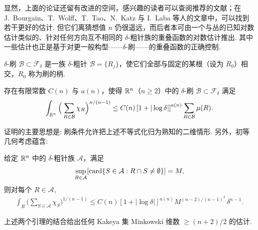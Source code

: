 显然，上面的论证还留有改进的空间，感兴趣的读者可以查阅推荐的文献；在 J.~Bourgain、T.~Wolff、T.~Tao、N.~Katz 与 I.~Laba 等人的文章中，可以找到若干更好的估计. 但它们离猜想值 $n$ 仍很遥远，而后者本可由一个与丛的已知对数估计类似的、针对任何方向互不相同的 $\delta$-粗针族的重叠函数的对数估计推出. 其中一些估计也正是基于对更一般构型——$\delta$-刷——的重叠函数的正确控制.

\begin{definition}\label{def:3.15}
$\delta$-刷 $\mathcal{B} \subset \mathcal{F}_\delta$ 是一族 $\delta$-粗针 $\mathcal{B} = \{R_j\}$，使它们全部与固定的某根（设为 $R_0$）相交，$R_0$ 称为刷的柄.
\end{definition}

\begin{lemma}\label{lem:3.16}
存在有限常数 $C(n)$ 与 $a(n)$，使得 $\mathbb{R}^n$（$n \geq 2$）中的 $\delta$-刷 $\mathcal{B} \subset \mathcal{F}_\delta$ 满足
\begin{align*}
  \int_{\mathbb{R}^{n}}\Big(\sum_{R\in\mathcal{B}}\chi_{R}\Big)^{n/(n-1)}
  \leq C(n)\left[1+|\log\delta|\right]^{a(n)}\sum_{R\in\mathcal{B}}\mu(R).
\end{align*}
\end{lemma}

证明的主要思想是: 刷条件允许把上述不等式化归为熟知的二维情形. 另外，初等几何考虑蕴含:

\begin{lemma}\label{lem:3.17}
给定 $\mathbb{R}^n$ 中的 $\delta$-粗针族 $\mathcal{A}$，满足
\begin{align*}
  \sup_{R\in\mathcal{A}}[\operatorname{card}\{S\in\mathcal{A}:R\cap S\neq\emptyset\}]=M,
\end{align*}
则对每个 $R \in \mathcal{A}$,
\begin{align*}
  \int_{R}\Big(\sum_{S\in\mathcal{A}}\chi_{S}\Big)^{1/(n-1)}
  \leq C(n)\left[1+|\log\delta|\right]^{a(n)}
  M^{(n-2)/(n-1)^{2}}\,\delta^{n-1}.
\end{align*}
\end{lemma}

\begin{proposition}\label{prop:3.18}
上述两个引理的结合给出任何 Kakeya 集 Minkowski 维数 $\geq (n+2)/2$ 的估计.
\end{proposition}

